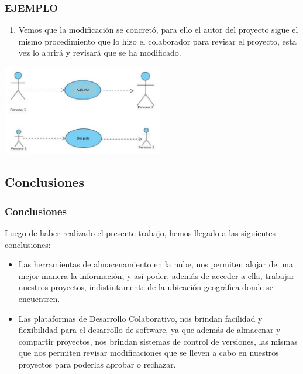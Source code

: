 \documentclass[8pt]{beamer}
\begin{document}
\begin{frame}
\frametitle{EJEMPLO}
\begin{enumerate}[24. ]
	\justifying
    \item Vemos que la modificación se concretó, para ello el autor del proyecto sigue el mismo procedimiento que lo hizo el colaborador para revisar el proyecto, esta vez lo abrirá y revisará que se ha modificado.\\
\end{enumerate}
\begin{center}
\includegraphics[width=7cm]{img/b37}\\
\fontsize{6}{1}
\end{center}
\end{frame}

\subsection{Conclusiones}
\begin{frame}
\frametitle{Conclusiones}
Luego de haber realizado el presente trabajo, hemos llegado a las siguientes conclusiones:
\begin{itemize}
\justifying
\item Las herramientas de almacenamiento en la nube, nos permiten alojar de una mejor manera la información, y así poder, además de acceder a ella, trabajar nuestros proyectos, indistintamente de la ubicación geográfica donde se encuentren.
\justifying
\item Las plataformas de Desarrollo Colaborativo, nos brindan facilidad y flexibilidad para el desarrollo de software, ya que además de almacenar y compartir proyectos, nos brindan sistemas de control de versiones, las mismas que nos permiten revisar modificaciones que se lleven a cabo en nuestros proyectos para poderlas aprobar o rechazar.
\end{itemize}
\end{frame}
\end{document}
